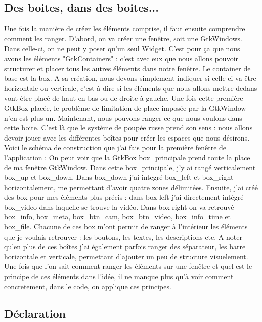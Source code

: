 \documentclass[11pt,french,a4paper]{report}
\begin{document}
        \subsection{Des boites, dans des boites...}
Une fois la manière de créer les éléments comprise, il faut ensuite comprendre comment les ranger. D'abord, on va créer une fenêtre, soit une GtkWindows. Dans celle-ci, on 
ne peut y poser qu'un seul Widget. C'est pour ça que nous avons les éléments "GtkContainers" : c'est avec eux que nous allons pouvoir structurer et placer tous les autres 
éléments dans notre fenêtre. Le container de base est la box. A sa création, nous devons simplement indiquer si celle-ci va être horizontale ou verticale, c'est à dire
si les éléments que nous allons mettre dedans vont être placé de haut en bas ou de droite à gauche. Une fois cette première GtkBox placée, le problème de limitation de place 
imposée par la GtkWindow n'en est plus un. Maintenant, nous pouvons ranger ce que nous voulons dans cette boite. C'est là que le système de poupée russe prend son sens : 
nous allons devoir jouer avec les différentes boîtes pour créer les espaces que nous désirons. Voici le schéma de construction que j'ai fais pour la première fenêtre de 
l'application : 
On peut voir que la GtkBox box\_principale prend toute la place de ma fenêtre GtkWindow. Dans cette box\_principale, j'y ai rangé verticalement box\_up et box\_down. Dans
box\_down j'ai integré box\_left et box\_right horizontalement, me permettant d'avoir quatre zones délimitées. Ensuite, j'ai créé des box pour mes éléments plus précis :
dans box left j'ai directement intégré box\_video dans laquelle se trouve la vidéo. Dans box right on va retrouvé box\_info, box\_meta, box\_btn\_cam, box\_btn\_video, 
box\_info\_time et box\_file. Chacune de ces box m'ont permit de ranger à l'intérieur les éléments que je voulais retrouver : les boutons, les textes, les descriptions etc. 
A noter qu'en plus de ces boîtes j'ai également parfois ranger des séparateur, les barre horizontale et verticale, permettant d'ajouter un peu de structure visuelement. \\
Une fois que l'on sait comment ranger les éléments sur une fenêtre et quel est le principe de ces éléments dans l'idée, il ne manque plus qu'à voir comment concretement, 
dans le code, on applique ces principes. 

        \subsection{Déclaration}
\end{document}
